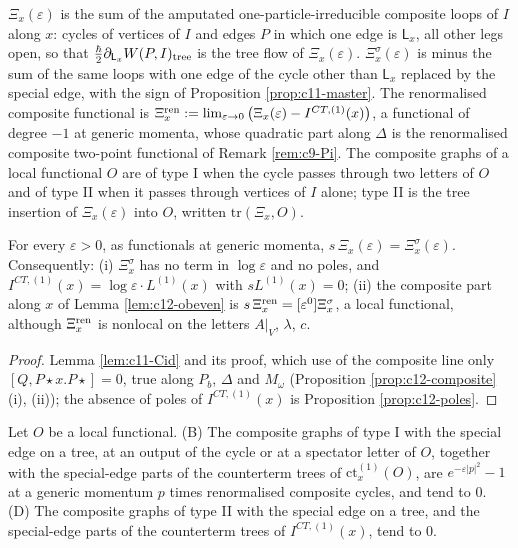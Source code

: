 \begin{definition}
\label{def:c12-Xi}
$\Xi_x(\varepsilon)$ is the sum of the amputated one-particle-irreducible composite loops of $I$ along $x$: cycles of vertices of $I$ and edges $P$ in which one edge is $\mathsf L_x$, all other legs open, so that $\tfrac\hbar2\partial_{\mathsf L_x}W(P,I)_{\rm tree}$ is the tree flow of $\Xi_x(\varepsilon)$. $\Xi^\sigma_x(\varepsilon)$ is minus the sum of the same loops with one edge of the cycle other than $\mathsf L_x$ replaced by the special edge, with the sign of Proposition \ref{prop:c11-master}. The renormalised composite functional is $\Xi^{\rm ren}_x:=\lim_{\varepsilon\to0}\big(\Xi_x(\varepsilon)-I^{CT,(1)}(x)\big)$, a functional of degree $-1$ at generic momenta, whose quadratic part along $\Delta$ is the renormalised composite two-point functional of Remark \ref{rem:c9-Pi}. The composite graphs of a local functional $O$ are of type I when the cycle passes through two letters of $O$ and of type II when it passes through vertices of $I$ alone; type II is the tree insertion of $\Xi_x(\varepsilon)$ into $O$, written $\mathrm{tr}(\Xi_x,O)$.
\end{definition}

\begin{lemma}
\label{lem:c12-Cid}
For every $\varepsilon>0$, as functionals at generic momenta, $s\,\Xi_x(\varepsilon)=\Xi^\sigma_x(\varepsilon)$. Consequently: (i) $\Xi^\sigma_x$ has no term in $\log\varepsilon$ and no poles, and $I^{CT,(1)}(x)=\log\varepsilon\cdot L^{(1)}(x)$ with $sL^{(1)}(x)=0$; (ii) the composite part along $x$ of Lemma \ref{lem:c12-obeven} is $s\,\Xi^{\rm ren}_x=[\varepsilon^0]\Xi^\sigma_x$, a local functional, although $\Xi^{\rm ren}_x$ is nonlocal on the letters $A|_V$, $\lambda$, $c$.
\end{lemma}

\begin{proof}
Lemma \ref{lem:c11-Cid} and its proof, which use of the composite line only $[Q,P\star x.P\star]=0$, true along $P_b$, $\Delta$ and $M_\omega$ (Proposition \ref{prop:c12-composite} (i), (ii)); the absence of poles of $I^{CT,(1)}(x)$ is Proposition \ref{prop:c12-poles}.
\end{proof}

\begin{lemma}
\label{lem:c12-BD}
Let $O$ be a local functional. (B) The composite graphs of type I with the special edge on a tree, at an output of the cycle or at a spectator letter of $O$, together with the special-edge parts of the counterterm trees of $\mathrm{ct}^{(1)}_x(O)$, are $e^{-\varepsilon|p|^2}-1$ at a generic momentum $p$ times renormalised composite cycles, and tend to $0$. (D) The composite graphs of type II with the special edge on a tree, and the special-edge parts of the counterterm trees of $I^{CT,(1)}(x)$, tend to $0$.
\end{lemma}

